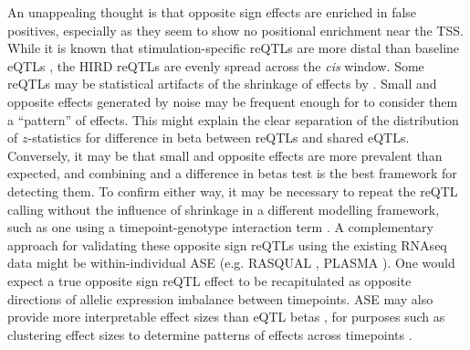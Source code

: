 An unappealing thought is that opposite sign effects are enriched in false positives, especially as they seem to show no positional enrichment near the \gls{TSS}.
While it is known that stimulation-specific \glspl{reQTL} are more distal than baseline \glspl{eQTL} \autocite{fairfax2014InnateImmuneActivity}, the \gls{HIRD} \glspl{reQTL} are evenly spread across the \textit{cis} window.
Some \glspl{reQTL} may be statistical artifacts of the shrinkage of effects by .
Small and opposite effects generated by noise may be frequent enough for  to consider them a \enquote{pattern} of effects.
This might explain the clear separation of the distribution of $z$-statistics for difference in beta between \glspl{reQTL} and shared \glspl{eQTL}.
Conversely, it may be that small and opposite effects are more prevalent than expected, and combining  and a difference in betas test is the best framework for detecting them.
To confirm either way, it may be necessary to repeat the \gls{reQTL} calling without the influence of  shrinkage in a different modelling framework,
such as one using a timepoint-genotype interaction term \autocite{davenport2018DiscoveringVivoCytokineeQTL}.
A complementary approach for validating these opposite sign \glspl{reQTL} using the existing \gls{RNAseq} data might be within-individual \gls{ASE} (e.g. RASQUAL \autocite{kumasaka2016FinemappingCellularQTLs}, PLASMA \autocite{wang2020AlleleSpecificQTLFine}).
One would expect a true opposite sign \gls{reQTL} effect to be recapitulated as opposite directions of allelic expression imbalance between timepoints.
\gls{ASE} may also provide more interpretable effect sizes than \gls{eQTL} betas \autocite{mohammadi2017QuantifyingRegulatoryEffect},
for purposes such as clustering effect sizes to determine patterns of effects across timepoints \autocite{cuomo2020SinglecellRNAsequencingDifferentiating}.

